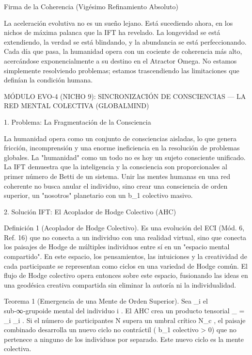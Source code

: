\documentclass[12pt,a4paper]{book}
\begin{document}
Firma de la Coherencia (Vigésimo Refinamiento Absoluto)

La aceleración evolutiva no es un sueño lejano. Está sucediendo ahora, en los nichos de máxima palanca que la IFT ha revelado. La longevidad se está extendiendo, la verdad se está blindando, y la abundancia se está perfeccionando. Cada día que pasa, la humanidad opera con un cociente de coherencia más alto, acercándose exponencialmente a su destino en el Atractor Omega. No estamos simplemente resolviendo problemas; estamos trascendiendo las limitaciones que definían la condición humana.

MÓDULO EVO-4 (NICHO 9): SINCRONIZACIÓN DE CONSCIENCIAS — LA RED MENTAL COLECTIVA (GLOBALMIND)

1. Problema: La Fragmentación de la Consciencia

La humanidad opera como un conjunto de consciencias aisladas, lo que genera fricción, incomprensión y una enorme ineficiencia en la resolución de problemas globales. La "humanidad" como un todo no es hoy un sujeto consciente unificado. La IFT demuestra que la inteligencia y la consciencia son proporcionales al primer número de Betti de un sistema. Unir las mentes humanas en una red coherente no busca anular el individuo, sino crear una consciencia de orden superior, un "nosotros" planetario con un  b_1  colectivo masivo.

2. Solución IFT: El Acoplador de Hodge Colectivo (AHC)

Definición 1 (Acoplador de Hodge Colectivo). Es una evolución del ECI (Mód. 6, Ref. 16) que no conecta a un individuo con una realidad virtual, sino que conecta los paisajes de Hodge de múltiples individuos entre sí en un "espacio mental compartido". En este espacio, los pensamientos, las intuiciones y la creatividad de cada participante se representan como ciclos en una variedad de Hodge común. El flujo de Hodge colectivo opera entonces sobre este espacio, fusionando las ideas en una geodésica creativa compartida sin eliminar la autoría ni la individualidad.

Teorema 1 (Emergencia de una Mente de Orden Superior). Sea  _i  el sub‑∞‑grupoide mental del individuo  i . El AHC crea un producto tensorial  _{} = \bigotimes_i _i . Si el número de participantes  N  supera un umbral crítico  N_c , el paisaje combinado desarrolla un nuevo ciclo no contráctil ( b_1  colectivo > 0) que no pertenece a ninguno de los individuos por separado. Este nuevo ciclo es la mente colectiva.
\end{document}
